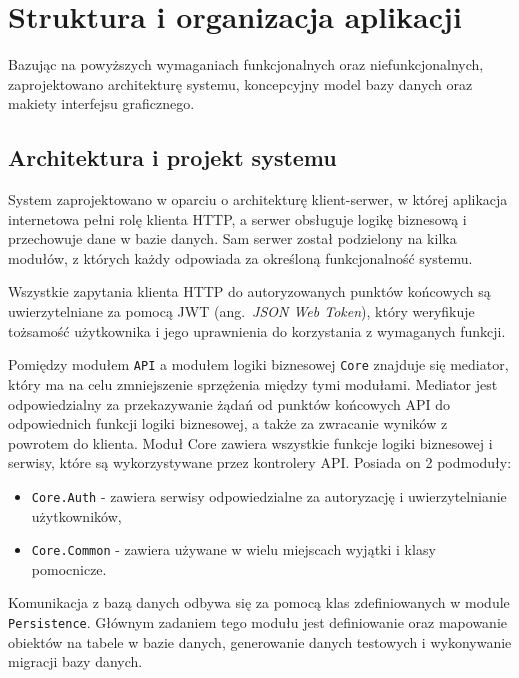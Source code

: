 \section{Struktura i organizacja aplikacji}
Bazując na powyższych wymaganiach funkcjonalnych oraz niefunkcjonalnych, zaprojektowano architekturę systemu, koncepcyjny model bazy danych oraz makiety interfejsu graficznego.
\subsection{Architektura i projekt systemu}
System zaprojektowano w oparciu o architekturę klient-serwer, w której aplikacja internetowa pełni rolę klienta HTTP, a serwer obsługuje logikę biznesową i przechowuje dane w bazie danych.
Sam serwer został podzielony na kilka modułów, z których każdy odpowiada za określoną funkcjonalność systemu.

Wszystkie zapytania klienta HTTP do autoryzowanych punktów końcowych są uwierzytelniane za pomocą JWT (ang.~\emph{JSON Web Token}), 
który weryfikuje tożsamość użytkownika i jego uprawnienia do korzystania z wymaganych funkcji.

Pomiędzy modułem \texttt{API} a modułem logiki biznesowej \texttt{Core} znajduje się mediator, który ma na celu zmniejszenie sprzężenia między tymi modułami.
Mediator jest odpowiedzialny za przekazywanie żądań od punktów końcowych API do odpowiednich funkcji logiki biznesowej, a także za zwracanie wyników z powrotem do klienta.
Moduł Core zawiera wszystkie funkcje logiki biznesowej i serwisy, które są wykorzystywane przez kontrolery API. 
Posiada on 2 podmoduły: 
\begin {itemize}
    \item \texttt{Core.Auth} - zawiera serwisy odpowiedzialne za autoryzację i uwierzytelnianie użytkowników,
    \item \texttt{Core.Common} - zawiera używane w wielu miejscach wyjątki i klasy pomocnicze.
\end{itemize}

Komunikacja z bazą danych odbywa się za pomocą klas zdefiniowanych w module \texttt{Persistence}.
Głównym zadaniem tego modułu jest definiowanie oraz mapowanie obiektów na tabele w bazie danych, generowanie danych testowych i wykonywanie migracji bazy danych.

